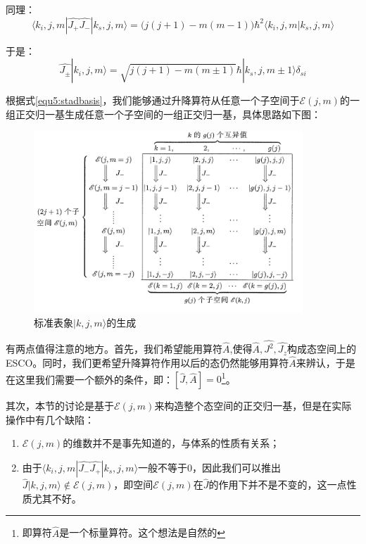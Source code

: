        同理：
        \begin{equation}
            \langle k_i,j,m|\hat{J_+}\hat{J_-}|k_s,j,m\rangle=\Big( j(j+1)-m(m-1)\Big)\hbar^2\langle k_i,j,m|k_s,j,m\rangle
        \end{equation}
        
        于是：\label{equ3:totangularmom}
        \begin{equation}\label{equ5:stadbasis}
            \hat{J_\pm } |k_i,j,m\rangle = \sqrt{j(j+1)-m(m\pm 1)}\hbar |k_s,j,m \pm1\rangle  \delta_{si}
        \end{equation}
        
        根据式\ref{equ5:stadbasis}，我们能够通过升降算符从任意一个子空间于$\mathcal{E}(j,m)$的一组正交归一基生成任意一个子空间的一组正交归一基，具体思路如下图：
        \begin{figure}[htp]
            \centering
            \includegraphics[width=0.9\textwidth]{figure/stadbasis.jpg}
            \caption{标准表象$|k,j,m\rangle$的生成}
            \label{fig5:standbasis}
        \end{figure}
        
        有两点值得注意的地方。首先，我们希望能用算符$\hat{A}$,使得$\hat{A},\hat{J^2},\hat{J_z}$构成态空间上的ESCO。同时，我们更希望升降算符作用以后的态仍然能够用算符$\hat{A}$来辨认，于是在这里我们需要一个额外的条件，即：$[\hat{J},\hat{A}]=0$\footnote{即算符$\hat{A}$是一个标量算符。这个想法是自然的}。
        
        其次，本节的讨论是基于$\mathcal{E}(j,m)$来构造整个态空间的正交归一基，但是在实际操作中有几个缺陷：
        \begin{enumerate}
            \item $\mathcal{E}(j,m)$的维数并不是事先知道的，与体系的性质有关系；
            \item 由于$\langle k_i,j,m|\hat{J_-}\hat{J_+}|k_s,j,m\rangle$一般不等于0，因此我们可以推出$\hat{J}|k,j,m\rangle \notin \mathcal{E}(j,m)$，即空间$\mathcal{E}(j,m)$在$\hat{J}$的作用下并不是不变的，这一点性质尤其不好。
        \end{enumerate}
        
